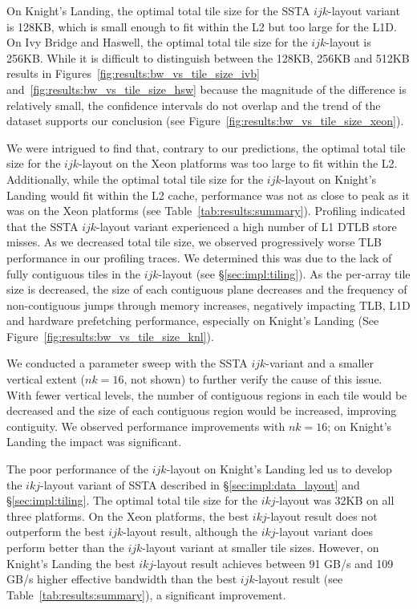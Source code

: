 \documentclass[10pt, conference, compsocconf]{IEEEtran}
\begin{document}
On Knight's Landing, the optimal total tile size for the SSTA \(ijk\)-layout
  variant is 128KB, which is small enough to fit within the L2 but too large
  for the L1D. 
On Ivy Bridge and Haswell, the optimal total tile size for the \(ijk\)-layout 
  is 256KB.
While it is difficult to distinguish between the 128KB, 256KB and 512KB results
  in Figures~\ref{fig:results:bw_vs_tile_size_ivb} and~\ref{fig:results:bw_vs_tile_size_hsw}
  because the magnitude of the difference is relatively small, the confidence
  intervals do not overlap and the trend of the dataset supports our conclusion
  (see Figure~\ref{fig:results:bw_vs_tile_size_xeon}).

We were intrigued to find that, contrary to our predictions, the optimal total
  tile size for the \(ijk\)-layout on the Xeon platforms was too large to fit
  within the L2.
Additionally, while the optimal total tile size for the \(ijk\)-layout on
  Knight's Landing would fit within the L2 cache, performance was not as close to
  peak as it was on the Xeon platforms (see Table~\ref{tab:results:summary}).
Profiling indicated that the SSTA \(ijk\)-layout variant experienced a high
  number of L1 DTLB store misses.
As we decreased total tile size, we observed progressively worse TLB performance
  in our profiling traces.
We determined this was due to the lack of fully contiguous tiles in the
  \(ijk\)-layout (see \S\ref{sec:impl:tiling}). 
As the per-array tile size is decreased, the size of each contiguous
  plane decreases and the frequency of non-contiguous jumps through memory
  increases, negatively impacting TLB, L1D and hardware prefetching performance,
  especially on Knight's Landing (See
  Figure~\ref{fig:results:bw_vs_tile_size_knl}).

We conducted a parameter sweep with the SSTA \(ijk\)-variant and a smaller
  vertical extent (\(nk = 16\), not shown) to further verify the cause of this
  issue.
With fewer vertical levels, the number of contiguous regions in each tile would
  be decreased and the size of each contiguous region would be increased,
  improving contiguity.
We observed performance improvements with \(nk = 16\); on Knight's Landing
  the impact was significant.

The poor performance of the \(ijk\)-layout on Knight's Landing led us to
  develop the \(ikj\)-layout variant of SSTA described in
  \S\ref{sec:impl:data_layout} and \S\ref{sec:impl:tiling}.
The optimal total tile size for the \(ikj\)-layout was 32KB on all three
  platforms.
On the Xeon platforms, the best \(ikj\)-layout result does not outperform the
  best \(ijk\)-layout result, although the \(ikj\)-layout variant does perform
  better than the \(ijk\)-layout variant at smaller tile sizes.
However, on Knight's Landing the best \(ikj\)-layout result achieves
  between 91 GB/s and 109 GB/s higher effective bandwidth than the best
  \(ijk\)-layout result (see Table~\ref{tab:results:summary}), a significant
  improvement.
\end{document}
